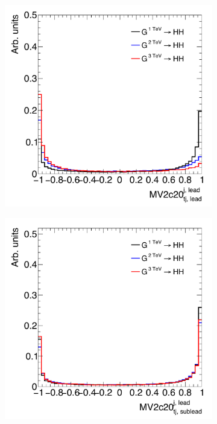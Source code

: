 \begin{figure}[t!]
  \centering
  \captionsetup{justification=centering}

   \begin{subfigure}[t]{0.5\textwidth}
        \centering
        \includegraphics[width=\textwidth]{figures/LeadTrackJet_MV2c20}
        \caption{}
    \end{subfigure}%
    \begin{subfigure}[t]{0.5\textwidth}
        \centering
        \includegraphics[width=\textwidth]{figures/SubleadTrackJet_MV2c20}
        \caption{}
    \end{subfigure}


\end{figure}
